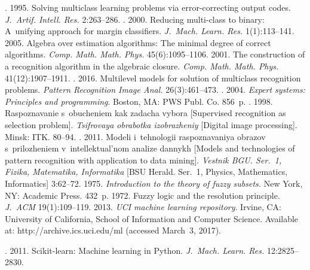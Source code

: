 \begin{multicols}{2}
{{\begin{thebibliography}{99}
. 1995. Solving multiclass 
learning problems via error-correcting output codes. 
\textit{J.~Artif. Intell. Res.} 2:263--286.
. 2000. Reducing multi-class to binary: 
A~unifying approach for margin classifiers. 
\textit{J.~Mach. Learn. Res.} 1(1):113--141.
 2005. Algebra over estimation algorithms: 
The minimal degree of correct algorithms.
\textit{Comp. Math. Math. Phys.} 45(6):1095--1106.
 2001. The construction of a recognition algorithm in 
the algebraic closure. 
\textit{Comp. Math. Math. Phys.} 41(12):1907--1911.
. 2016. Multilevel
 models for solution of multiclass recognition problems. 
 \textit{Pattern Recognition Image Anal.} 26(3):461--473.
. 2004. \textit{Expert systems: 
Principles and programming}.  Boston, MA: PWS Publ. Co. 856~p.
. 1998. 
Ras\-po\-zna\-va\-nie s~obucheniem kak zadacha vybora
[Supervised recognition as selection problem]. 
\textit{Tsifrovaya obrabotka izobrazheniy} [Digital image processing]. 
Minsk: ITK. 80--94.
. 
2011. Modeli i~tehnologii ras\-po\-zna\-va\-niya obrazov s~prilozheniem v~intellektual'nom
analize dannykh [\mbox{Models} and technologies of pattern recognition with 
application to data mining]. 
\textit{Vestnik BGU. Ser.~1, Fizika, Ma\-te\-ma\-ti\-ka, Informatika}
[BSU Herald. Ser.~1, Physics, Mathematics, Informatics] 3:62--72.
 1975. \textit{Introduction to the theory of fuzzy subsets.}
New York, NY: Academic Press.
432~p.
 1972. Fuzzy logic and the resolution principle. 
\textit{J.~ACM} 19(1):109--119.
 2013. \textit{UCI machine learning repository}. 
Irvine, CA: University of California, School of Information and Computer Science.
Available at: {\sf http://archive.ics.uci.edu/ml}
(accessed March~3, 2017). 

. 2011. Scikit-learn: 
Machine learning in Python. \textit{J.~Mach. Learn. Res.} 12:2825--2830.
\end{thebibliography}

 }
 }

\end{multicols}

